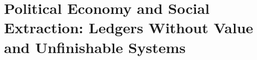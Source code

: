 \documentclass[11pt,twoside]{book}
\begin{document}
\frontmatter
\tableofcontents

\mainmatter
\part{Political Economy and Social Extraction: Ledgers Without Value and Unfinishable Systems}





\backmatter
\appendix


\end{document}
